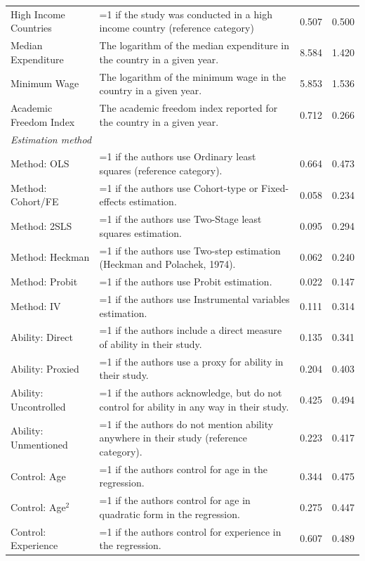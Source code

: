 \begin{singlespace}
\begin{scriptsize}
\begin{longtable}{
  @{\hskip\tabcolsep\extracolsep\fill}
  l
  p{0.55\hsize}
  cc
  @{}
  }
  High Income Countries & =1 if the study was conducted in a high income country (reference category) & 0.507 & 0.500 \\
  Median Expenditure & The logarithm of the median expenditure in the country in a given year. & 8.584 & 1.420 \\
  Minimum Wage & The logarithm of the minimum wage in the country in a given year. & 5.853 & 1.536 \\
  Academic Freedom Index & The academic freedom index reported for the country in a given year. & 0.712 & 0.266 \\
  \midrule
  
  \multicolumn{4}{l}{\emph{Estimation method}}\\
  Method: OLS & =1 if the authors use Ordinary least squares (reference category). & 0.664 & 0.473 \\
  Method: Cohort/FE & =1 if the authors use Cohort-type or Fixed-effects estimation. & 0.058 & 0.234 \\
  Method: 2SLS & =1 if the authors use Two-Stage least squares estimation. & 0.095 & 0.294 \\
  Method: Heckman & =1 if the authors use Two-step estimation (Heckman and Polachek, 1974). & 0.062 & 0.240 \\
  Method: Probit & =1 if the authors use Probit estimation. & 0.022 & 0.147 \\
  Method: IV & =1 if the authors use Instrumental variables estimation. & 0.111 & 0.314 \\
  Ability: Direct & =1 if the authors include a direct measure of ability in their study. & 0.135 & 0.341 \\
  Ability: Proxied & =1 if the authors use a proxy for ability in their study. & 0.204 & 0.403 \\
  Ability: Uncontrolled & =1 if the authors acknowledge, but do not control for ability in any way in their study. & 0.425 & 0.494 \\
  Ability: Unmentioned & =1 if the authors do not mention ability anywhere in their study (reference category). & 0.223 & 0.417 \\
  Control: Age & =1 if the authors control for age in the regression. & 0.344 & 0.475 \\
  Control: Age$^2$ & =1 if the authors control for age in quadratic form in the regression. & 0.275 & 0.447 \\
  Control: Experience & =1 if the authors control for experience in the regression. & 0.607 & 0.489 \\

\end{longtable}
\end{scriptsize}
\end{singlespace}
